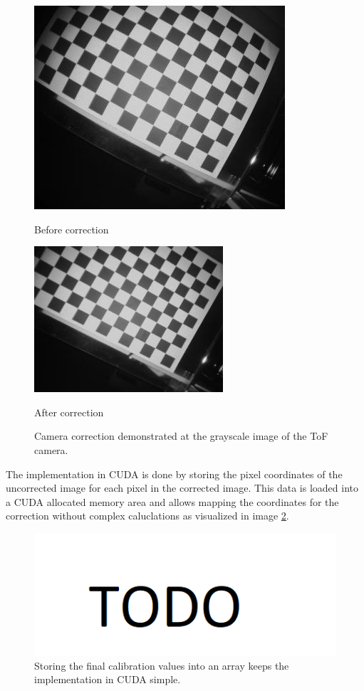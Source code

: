 \begin{figure}[H]
    \centering
    \begin{minipage}[b]{0.45\textwidth}
      \includegraphics[scale=0.70]{images/camcalib_source.jpg}
      \caption{Before correction}
      \label{fig:camCalibBefore} 
    \end{minipage} %
    \begin{minipage}[b]{0.45\textwidth}
      \includegraphics[scale=0.70]{images/camcalib_result.png} 
      \caption{After correction}
      \label{fig:camCalibAfter} 
    \end{minipage}
    \caption{Camera correction demonstrated at the grayscale image of the ToF camera.}
    \label{fig.camCalib}
  \end{figure}
The implementation in CUDA is done by storing the pixel coordinates of the uncorrected image for each pixel in the corrected image. This data is loaded into a CUDA allocated memory area and allows mapping the coordinates for the correction without complex caluclations as visualized in image \ref{im:CudaCamCalib}.
\begin{figure}[H]
    \centering
    \includegraphics[width=1.0\textwidth]{images/todo.png}
    \caption{Storing the final calibration values into an array keeps the implementation in CUDA simple.}
    \label{im:CudaCamCalib}
\end{figure}

